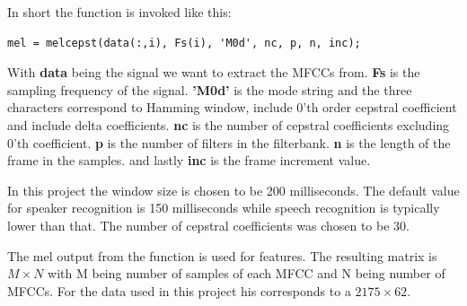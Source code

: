 In short the function is invoked like this:
\begin{verbatim}
mel = melcepst(data(:,i), Fs(i), 'M0d', nc, p, n, inc);
\end{verbatim}
With \textbf{data} being the signal we want to extract the MFCCs from. 
\textbf{Fs} is the sampling frequency of the signal. 
\textbf{'M0d'} is the mode string and the three characters correspond to Hamming window, include 0'th order cepstral coefficient and include delta coefficients.
\textbf{nc} is the number of cepstral coefficients excluding 0'th coefficient.
\textbf{p} is the number of filters in the filterbank.
\textbf{n} is the length of the frame in the samples.
and lastly \textbf{inc} is the frame increment value.

In this project the window size is chosen to be 200 milliseconds. The default value for speaker recognition is 150 milliseconds while speech recognition is typically lower than that. The number of cepstral coefficients was chosen to be 30.

The mel output from the function is used for features. The resulting matrix is $M \times N$ with M being number of samples of each MFCC and N being number of MFCCs. For the data used in this project his corresponds to a $2175 \times 62$.


